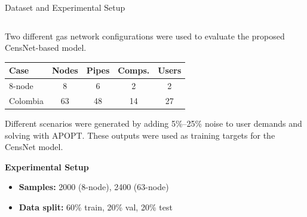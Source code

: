\documentclass[hyperref={colorlinks,citecolor=blue,linkcolor=blue,urlcolor=blue}]{beamer}
\begin{document}
\begin{frame}{Dataset and Experimental Setup}
\scriptsize
\begin{columns}[t,onlytextwidth]
    \begin{column}{0.55\textwidth}
        Two different gas network configurations were used to evaluate the proposed CensNet-based model.

        \vspace{0.3em}
        \begin{table}[H]
            \centering
            \setlength{\tabcolsep}{4pt}
            \renewcommand{\arraystretch}{1.1}
            \begin{tabular}{lcccc}
                \toprule
                \textbf{Case} & \textbf{Nodes} & \textbf{Pipes} & \textbf{Comps.} & \textbf{Users} \\
                \midrule
                8-node & 8  & 6  & 2  & 2  \\
                Colombia & 63 & 48 & 14 & 27 \\
                \bottomrule
            \end{tabular}
        \end{table}

        \vspace{0.5em}
        Different scenarios were generated by adding 5\%–25\% noise to user demands and solving with APOPT.
        These outputs were used as training targets for the CensNet model.
        
         \vspace{1em}

        \textbf{Experimental Setup}
        \begin{itemize}
            \item \textbf{Samples:} 2000 (8-node), 2400 (63-node)
            \item \textbf{Data split:} 60\% train, 20\% val, 20\% test  
        \end{itemize}
    \end{column}


\end{columns}
\end{frame}
\end{document}
